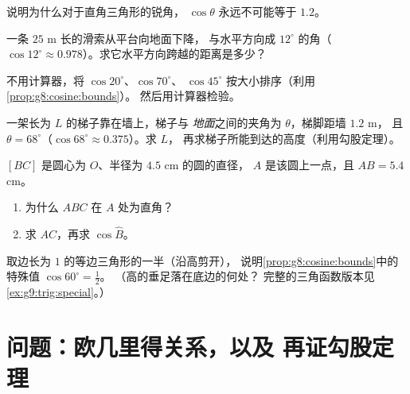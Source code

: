 \begin{exercise}[$\star$]\label{exo:g8:cosine:6}
说明为什么对于直角三角形的锐角，
$\cos\theta$ 永远不可能等于 $1.2$。
\end{exercise}

\begin{exercise}[$\star\star$]\label{exo:g8:cosine:7}
一条 $25$ m 长的滑索从平台向地面下降，
与水平方向成 $12^\circ$ 的角（$\cos 12^\circ \approx
0.978$）。求它水平方向跨越的距离是多少？
\end{exercise}

\begin{exercise}[$\star\star$]\label{exo:g8:cosine:8}
不用计算器，将 $\cos 20^\circ$、$\cos 70^\circ$、
$\cos 45^\circ$ 按大小排序（利用\cref{prop:g8:cosine:bounds}）。
然后用计算器检验。
\end{exercise}

\begin{exercise}[$\star\star$]\label{exo:g8:cosine:9}
一架长为 $L$ 的梯子靠在墙上，梯子与
\emph{地面}之间的夹角为 $\theta$，梯脚距墙 $1.2$ m，
且 $\theta = 68^\circ$（$\cos 68^\circ \approx 0.375$）。求 $L$，
再求梯子所能到达的高度（利用勾股定理）。
\end{exercise}

\begin{exercise}[$\star\star$]\label{exo:g8:cosine:10}
$[BC]$ 是圆心为 $O$、半径为 $4.5$ cm 的圆的直径，
$A$ 是该圆上一点，且 $AB = 5.4$ cm。
\begin{enumerate}
  \item 为什么 $ABC$ 在 $A$ 处为直角？
  \item 求 $AC$，再求 $\cos \widehat B$。
\end{enumerate}
\end{exercise}

\begin{exercise}[$\star\star\star$]\label{exo:g8:cosine:11}
取边长为 $1$ 的等边三角形的一半（沿高剪开），
说明\cref{prop:g8:cosine:bounds}中的特殊值 $\cos 60^\circ = \frac12$。
（高的垂足落在底边的何处？
完整的三角函数版本见
\cref{ex:g9:trig:special}。）
\end{exercise}

\section{问题：欧几里得关系，以及
再证勾股定理}

